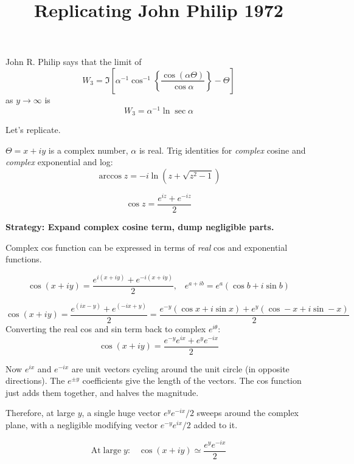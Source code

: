 \documentclass{article}
\title{Replicating John Philip 1972}
\begin{document}
\maketitle

John R. Philip says that the limit of 
\[ W_{3} = \Im \left[  
 \alpha^{-1} \cos^{-1} 
 \left\{ \frac{\cos(\alpha \Theta)}{\cos \alpha} \right\} - \Theta
   \right] \]
   as $y\rightarrow \infty$ is
   \[ W_{3} = \alpha^{-1} \ln \sec \alpha \]

Let's replicate.

$\Theta = x + iy$ is a complex number, $\alpha$ is real.  Trig identities for \emph{complex} cosine and \emph{complex} exponential and log:
\[ \arccos z = - i \ln (z + \sqrt{z^{2} - 1}) \]

\[ \cos z = \frac{e^{iz}+e^{-iz}}{2} \]

   

\textbf{Strategy: Expand complex cosine term, dump negligible parts.}

Complex cos function can be expressed in terms of \emph{real} cos and exponential functions.

\[\cos (x + iy) = \frac{e^{i(x+iy)}+e^{-i(x+iy)}}{2}, \;\;\;
 e^{a+ib} = e^{a}(\cos b + i\sin b ) \]
 
\[ \cos (x + iy) = 
   \frac{e^{(ix-y)}+e^{(-ix+y)}}{2} =
   \frac{e^{-y}(\cos x + i\sin x) + e^{y}(\cos -x + i\sin -x)}{2}   \] 
   Converting the real cos and sin term back to complex $e^{i\theta}:$
\[\cos (x + iy) = \frac{e^{-y} e^{ix} + e^{y} e^{-ix}}{2} \]

Now $e^{ix}$ and $e^{-ix}$ are unit vectors cycling around the unit circle (in opposite directions). The $e^{\pm y}$ coefficients give the length of the vectors.  The cos function just adds them together, and halves the magnitude. 

Therefore, at large $y$, a single huge vector $e^{y} e^{-ix}/2$ sweeps around the complex plane, with a negligible modifying vector $e^{-y} e^{ix}/2$ added to it.

\[ \mathrm{At \; large \; }y: \;\;\; \cos (x + iy) \simeq \frac{e^{y} e^{-ix}}{2}  \]
\end{document}
